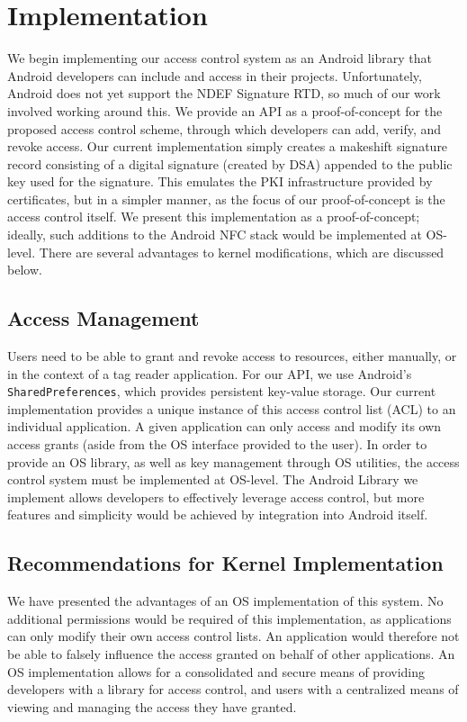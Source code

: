 \documentclass[12pt]{article}
\begin{document}
\section{Implementation}
We begin implementing our access control system as an Android library that Android developers can include and access in their projects.
Unfortunately, Android does not yet support the NDEF Signature RTD, so much of our work involved working around this.
We provide an API as a proof-of-concept for the proposed access control scheme, through which developers can add, verify, and revoke access.
Our current implementation simply creates a makeshift signature record consisting of a digital signature (created by DSA) appended to the public key used for the signature.
This emulates the PKI infrastructure provided by certificates, but in a simpler manner, as the focus of our proof-of-concept is the access control itself.
We present this implementation as a proof-of-concept; ideally, such additions to the Android NFC stack would be implemented at OS-level.
There are several advantages to kernel modifications, which are discussed below.

\subsection{Access Management}
Users need to be able to grant and revoke access to resources, either manually, or in the context of a tag reader application.
For our API, we use Android's \texttt{SharedPreferences}, which provides persistent key-value storage.
Our current implementation provides a unique instance of this access control list (ACL) to an individual application.
A given application can only access and modify its own access grants (aside from the OS interface provided to the user).
In order to provide an OS library, as well as key management through OS utilities, the access control system must be implemented at OS-level.
The Android Library we implement allows developers to effectively leverage access control, but more features and simplicity would be achieved by integration into Android itself.

\subsection{Recommendations for Kernel Implementation}
We have presented the advantages of an OS implementation of this system.
No additional permissions would be required of this implementation, as applications can only modify their own access control lists.
An application would therefore not be able to falsely influence the access granted on behalf of other applications.
An OS implementation allows for a consolidated and secure means of providing developers with a library for access control, and users with a centralized means of viewing and managing the access they have granted.
\end{document}
